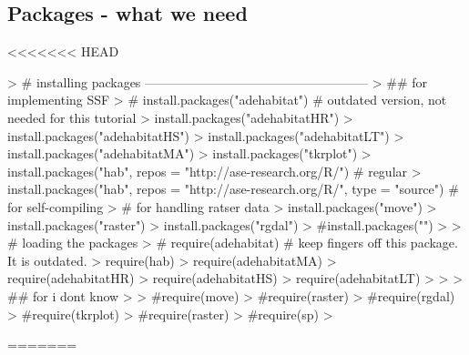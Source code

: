 \documentclass[11pt, a4paper]{article} %
\begin{document}
\subsection{Packages - what we need}

<<<<<<< HEAD
\begin{Schunk}
\begin{Sinput}
> # installing packages -----------------------------------------------------
> ## for implementing SSF
> # install.packages("adehabitat") # outdated version, not needed for this tutorial
> install.packages("adehabitatHR")
> install.packages("adehabitatHS")
> install.packages("adehabitatLT")
> install.packages("adehabitatMA")
> install.packages("tkrplot")
> install.packages("hab", repos = "http://ase-research.org/R/") # regular
> install.packages("hab", repos = "http://ase-research.org/R/", type = "source") # for self-compiling
> # for handling ratser data
> install.packages("move")
> install.packages("raster")
> install.packages("rgdal")
> #install.packages("")
> 
> # loading the packages
> # require(adehabitat) # keep fingers off this package. It is outdated.
> require(hab)
> require(adehabitatMA)
> require(adehabitatHR)
> require(adehabitatHS)
> require(adehabitatLT)
> 
> 
> ## for i dont know
> 
> #require(move)
> #require(raster)
> #require(rgdal)
> #require(tkrplot)
> #require(raster)
> #require(sp)
> 
\end{Sinput}
\end{Schunk}
=======
\end{document}
